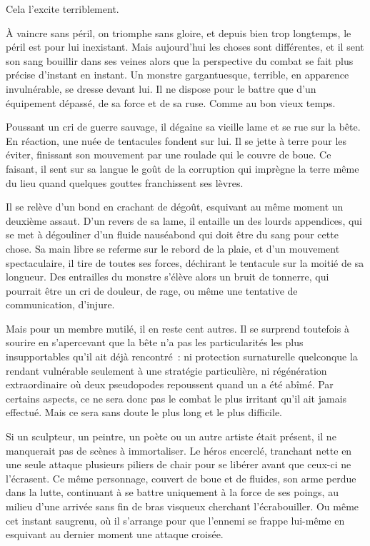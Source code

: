 \documentclass{report}
\begin{document}
Cela l'excite terriblement.

À vaincre sans péril, on triomphe sans gloire, et depuis bien trop longtemps, le péril est pour lui inexistant. Mais aujourd'hui les choses sont différentes, et il sent son sang bouillir dans ses veines alors que la perspective du combat se fait plus précise d'instant en instant. Un monstre gargantuesque, terrible, en apparence invulnérable, se dresse devant lui. Il ne dispose pour le battre que d'un équipement dépassé, de sa force et de sa ruse. Comme au bon vieux temps.

Poussant un cri de guerre sauvage, il dégaine sa vieille lame et se rue sur la bête. En réaction, une nuée de tentacules fondent sur lui. Il se jette à terre pour les éviter, finissant son mouvement par une roulade qui le couvre de boue. Ce faisant, il sent sur sa langue le goût de la corruption qui imprègne la terre même du lieu quand quelques gouttes franchissent ses lèvres.

Il se relève d'un bond en crachant de dégoût, esquivant au même moment un deuxième assaut. D'un revers de sa lame, il entaille un des lourds appendices, qui se met à dégouliner d'un fluide nauséabond qui doit être du sang pour cette chose. Sa main libre se referme sur le rebord de la plaie, et d'un mouvement spectaculaire, il tire de toutes ses forces, déchirant le tentacule sur la moitié de sa longueur. Des entrailles du monstre s'élève alors un bruit de tonnerre, qui pourrait être un cri de douleur, de rage, ou même une tentative de communication, d'injure.

Mais pour un membre mutilé, il en reste cent autres. Il se surprend toutefois à sourire en s'apercevant que la bête n'a pas les particularités les plus insupportables qu'il ait déjà rencontré : ni protection surnaturelle quelconque la rendant vulnérable seulement à une stratégie particulière, ni régénération extraordinaire où  deux pseudopodes repoussent quand un a été abîmé. Par certains aspects, ce ne sera donc pas le combat le plus irritant qu'il ait jamais effectué. Mais ce sera sans doute le plus long et le plus difficile.

Si un sculpteur, un peintre, un poète ou un autre artiste était présent, il ne manquerait pas de scènes à immortaliser. Le héros encerclé, tranchant nette en une seule attaque plusieurs piliers de chair pour se libérer avant que ceux-ci ne l'écrasent. Ce même personnage, couvert de boue et de fluides, son arme perdue dans la lutte, continuant à se battre uniquement à la force de ses poings, au milieu d'une arrivée sans fin de bras visqueux cherchant l'écrabouiller. Ou même cet instant saugrenu, où il s'arrange pour que l'ennemi se frappe lui-même en esquivant au dernier moment une attaque croisée.
\end{document}
